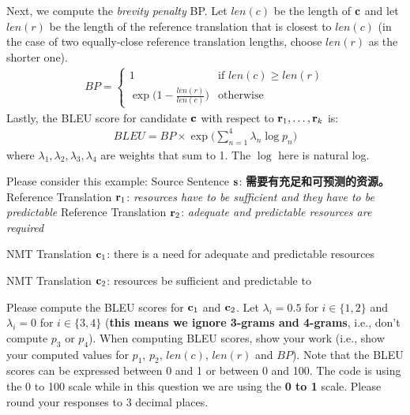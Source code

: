 \begin{parts}
    Next, we compute the \textit{brevity penalty} BP. Let $len(c)$ be the length of $\mathbf{c}$ and let $len(r)$ be the length of the reference translation that is closest to $len(c)$ (in the case of two equally-close reference translation lengths, choose $len(r)$ as the shorter one). 
    \begin{align}
        BP = 
        \begin{cases}
            1 & \text{if } len(c) \ge len(r) \\
            \exp \big( 1 - \frac{len(r)}{len(c)} \big) & \text{otherwise}
        \end{cases}
    \end{align}
    Lastly, the BLEU score for candidate $\mathbf{c}$ with respect to $\mathbf{r}_1,\dots,\mathbf{r}_k$ is:
    \begin{align}
        BLEU = BP \times \exp \Big( \sum_{n=1}^4 \lambda_n \log p_n \Big)
    \end{align}
    where $\lambda_1,\lambda_2,\lambda_3,\lambda_4$ are weights that sum to 1. The $\log$ here is natural log.
    \newline
    \begin{subparts}
        \subpart[5] Please consider this example: \newline
        Source Sentence $\mathbf{s}$: \textbf{需要有充足和可预测的资源。} 
        \newline
        Reference Translation $\mathbf{r}_1$: \textit{resources have to be sufficient and they have to be predictable}
        \newline
        Reference Translation $\mathbf{r}_2$: \textit{adequate and predictable resources are required}
        
        NMT Translation $\mathbf{c}_1$: there is a need for adequate and predictable resources
        
        NMT Translation $\mathbf{c}_2$: resources be suﬀicient and predictable to
        
        Please compute the BLEU scores for $\mathbf{c}_1$ and $\mathbf{c}_2$. Let $\lambda_i=0.5$ for $i\in\{1,2\}$ and $\lambda_i=0$ for $i\in\{3,4\}$ (\textbf{this means we ignore 3-grams and 4-grams}, i.e., don't compute $p_3$ or $p_4$). When computing BLEU scores, show your work (i.e., show your computed values for $p_1$, $p_2$, $len(c)$, $len(r)$ and $BP$). Note that the BLEU scores can be expressed between 0 and 1 or between 0 and 100. The code is using the 0 to 100 scale while in this question we are using the \textbf{0 to 1} scale. Please round your responses to 3 decimal places. 
        \newline
        

\end{subparts}
\end{parts}
